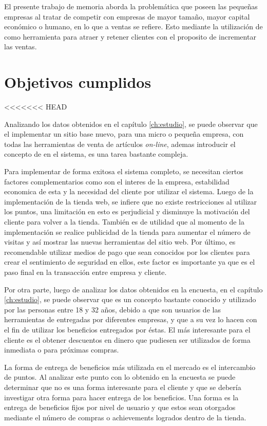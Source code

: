 El presente trabajo de memoria aborda la problemática que poseen las pequeñas
empresas al tratar de competir con empresas de mayor tamaño, mayor capital
económico o humano, en lo que a ventas se refiere. Esto mediante la utilización de {\gam} 
como herramienta para atraer y retener clientes con el proposito de incrementar las ventas.

\section{Objetivos cumplidos}

<<<<<<< HEAD

Analizando los datos obtenidos en el capítulo \ref{ch:estudio}, se puede observar que el
implementar un sitio base nuevo, para una micro o pequeña empresa, con todas las
herramientas de venta de artículos \emph{on-line}, ademas introducir el concepto de {\gam} en el sistema,
 es una tarea bastante compleja.

Para implementar de forma exitosa el sistema completo, se necesitan ciertos factores
complementarios como son el interes de la empresa, estabilidad economica de esta y la necesidad del cliente 
por utilizar el sistema. Luego de la implementación de la tienda web, 
se infiere que no existe restricciones al utilizar los puntos, una limitación
en esto es perjudicial y disminuye la motivación del cliente para volver a la tienda.
También es de utilidad que al momento de la implementación se realice publicidad
de la tienda para aumentar el número de visitas y así mostrar las nuevas herramientas
del sitio web. Por último, es recomendable utilizar medios de pago que sean conocidos
por los clientes para crear el sentimiento de seguridad en ellos, este factor es importante
ya que es el paso final en la transacción entre empresa y cliente.

Por otra parte, luego de analizar los datos obtenidos en la encuesta, en el capítulo \ref{ch:estudio},
 se puede observar que {\gam} es un concepto bastante conocido y utilizado por las personas
entre 18 y 32 años, debido a que son usuarios de las herramientas de {\gam} entregadas por
diferentes empresas, y que a su vez lo hacen con el fin de utilizar los beneficios entregados
por éstas. El más interesante para el cliente es el obtener descuentos en dinero
que pudiesen ser utilizados de forma inmediata o para próximas compras.

La forma de entrega de beneficios más utilizada en el mercado es el intercambio de puntos.
Al analizar este punto con lo obtenido en la encuesta se puede determinar que no es
una forma interesante para el cliente y que se debería investigar otra forma para
hacer entrega de los beneficios. Una forma es la entrega de beneficios fijos por nivel
de usuario y que estos sean otorgados mediante el número de compras o achievements logrados
dentro de la tienda.

